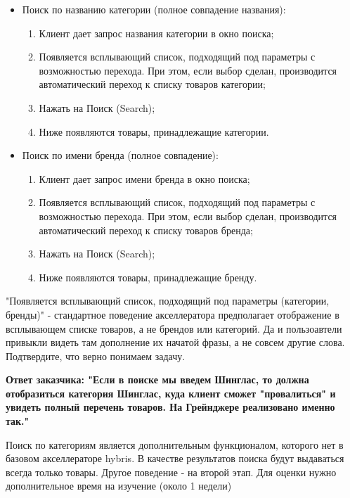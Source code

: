 {\begin{wikilong}
\begin{itemize}
		\item Поиск по названию категории (полное совпадение названия):
		 	\begin{enumerate} 
		 		\item Клиент дает запрос названия категории в окно поиска;
				\item	Появляется всплывающий список, подходящий под параметры с возможностью перехода. При этом, если выбор сделан, производится автоматический переход к списку товаров категории;
				\item	Нажать на Поиск (Search);
				\item	Ниже появляются товары, принадлежащие категории.
			\end{enumerate}	
				
		\item	Поиск по имени бренда (полное совпадение):
		 	\begin{enumerate} 
				\item	Клиент дает запрос имени бренда в окно поиска;
				\item	Появляется всплывающий список, подходящий под параметры с возможностью перехода. При этом, если выбор сделан, производится автоматический переход к списку товаров бренда;
				\item	Нажать на Поиск (Search);
				\item	Ниже появляются товары, принадлежащие бренду.
			\end{enumerate}	
	\end{itemize}
\end{wikilong}

\begin{teamidea}
"Появляется всплывающий список, подходящий под параметры (категории, бренды)" - стандартное поведение акселлератора предполагает отображение в всплывающем списке товаров, а не брендов или категорий. Да и пользоавтели привыкли видеть там дополнение их начатой фразы, а не совсем другие слова. Подтвердите, что верно понимаем задачу.

\textbf{Ответ заказчика: "Если в поиске мы введем Шинглас, то должна отобразиться категория Шинглас, куда клиент сможет "провалиться" и увидеть полный перечень товаров. На Грейнджере реализовано именно так."}

Поиск по категориям является дополнительным функционалом, которого нет в базовом акселлераторе hybris. В качестве результатов поиска будут выдаваться всегда только товары. Другое поведение - на второй этап. Для оценки нужно дополнительное время на изучение (около 1 недели)
\end{teamidea}

}
